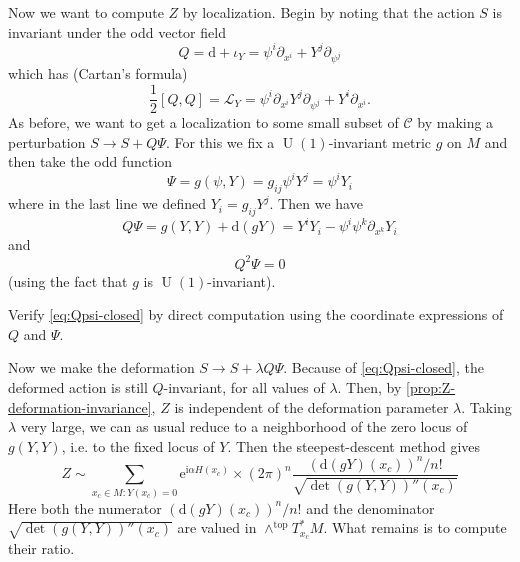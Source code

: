 \documentclass[12pt,letterpaper,reqno]{article}
\numberwithin{equation}{section}
\newcommand{\cC}{\ensuremath{\mathcal C}}
\newcommand{\cL}{\ensuremath{\mathcal L}}
\newcommand{\half}{\ensuremath{\frac{1}{2}}}
\newcommand{\I}{{\mathrm i}}
\newcommand{\e}{{\mathrm e}}
\newcommand{\de}{\mathrm{d}}
\newcommand{\rmtop}{\mathrm{top}}
\DeclareMathOperator{\U}{U}
\newcommand{\fixme}[1]{{\color{orange}{[#1]}}}
\begin{document}
Now we want to compute $Z$ by localization.
Begin by noting that the action $S$ is invariant under the odd vector field
\begin{equation}
  Q = \de + \iota_Y = \psi^i \partial_{x^i} + Y^j \partial_{\psi^j}
\end{equation}
which has (Cartan's formula)
\begin{equation}
  \half [Q,Q] = \cL_Y = \psi^i \partial_{x^i} Y^j \partial_{\psi^j} + Y^i \partial_{x^i}.
\end{equation}
As before, we want to get a localization to some small subset of
$\cC$ by making a perturbation $S \to S + Q \Psi$.
For this we fix a $\U(1)$-invariant metric $g$ on $M$ and then 
take the odd function
\begin{equation}
  \Psi = g(\psi, Y) = g_{ij} \psi^i Y^j = \psi^i Y_i
\end{equation}
where in the last line we defined $Y_i = g_{ij} Y^j$.
Then we have
\begin{equation}
  Q \Psi = g(Y,Y) + \de(gY) = Y^i Y_i - \psi^i \psi^k \partial_{x^k} Y_i
\end{equation}
and 
\begin{equation} \label{eq:Qpsi-closed}
  Q^2 \Psi = 0
\end{equation}
(using the fact that $g$ is $\U(1)$-invariant).
\begin{exercise} Verify \eqref{eq:Qpsi-closed} by direct computation
using the coordinate expressions of $Q$ and $\Psi$.
\end{exercise}

Now we make the deformation $S \to S + \lambda Q \Psi$.
Because of \eqref{eq:Qpsi-closed}, the deformed action is 
still $Q$-invariant, for all values of $\lambda$.
Then, by \autoref{prop:Z-deformation-invariance},
$Z$ is independent of the deformation parameter $\lambda$.
Taking $\lambda$ very large, we can as usual 
reduce to a neighborhood of the zero locus of $g(Y,Y)$, i.e. to the fixed locus of $Y$. Then the steepest-descent method gives
\begin{equation} \label{eq:dh-steepest-descent}
  Z \sim \sum_{x_c \in M: Y(x_c) = 0} \e^{\I \alpha H(x_c)} \times (2\pi)^n \frac{(\de(gY)(x_c))^n/n!}{\sqrt{\det (g(Y,Y))''(x_c)}}
\end{equation}
Here both the numerator
$(\de(gY)(x_c))^n/n!$
and the denominator
$\sqrt{\det (g(Y,Y))''(x_c)}$ 
are valued in $\wedge^\rmtop T^*_{x_c} M$.
\fixme{it would be nicer to be careful about 
twists by orientation bundle here; we always
use the standard orientation to avoid having to worry about it}
What remains is to compute their ratio.
\end{document}
